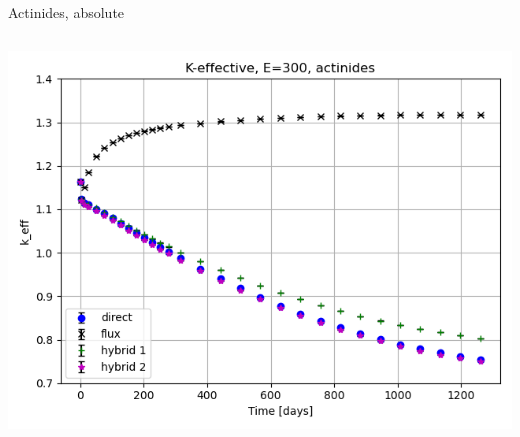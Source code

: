 \documentclass[
	11pt, %
	aspectratio=169, %
]{beamer}
\begin{document}
\begin{frame}{Actinides, absolute}
	\begin{columns}[c] %
		\begin{column}{0.39\textwidth}
			\includegraphics[width=\textwidth]{../figures/keff/keff_actinides_300.png}


\end{column}
\end{columns}
\end{frame}
\end{document}
